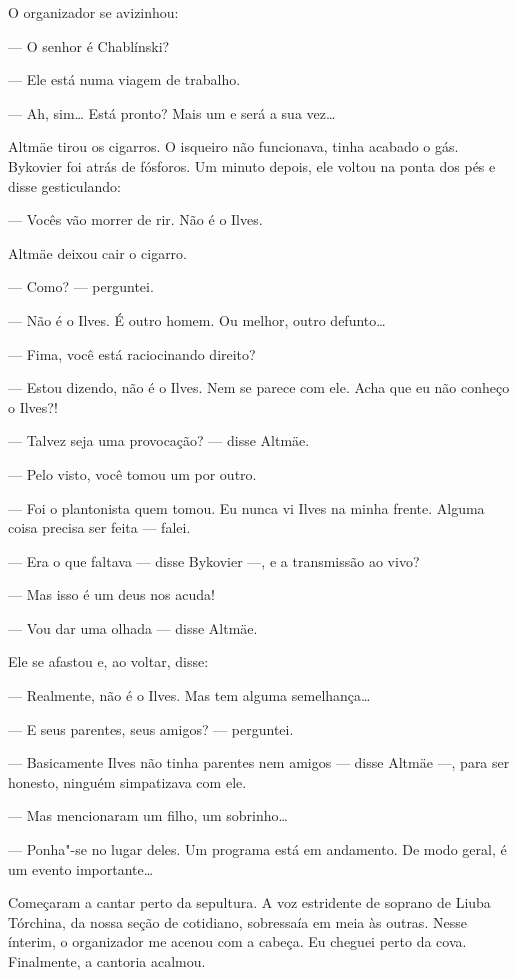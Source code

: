 O organizador se avizinhou:

--- O senhor é Chablínski?

--- Ele está numa viagem de trabalho.

--- Ah, sim\ldots{} Está pronto? Mais um e será a sua vez\ldots{}

Altmäe tirou os cigarros. O isqueiro não funcionava, tinha acabado o
gás. Bykovier foi atrás de fósforos. Um minuto depois, ele voltou na
ponta dos pés e disse gesticulando:

--- Vocês vão morrer de rir. Não é o Ilves.

Altmäe deixou cair o cigarro.

--- Como? --- perguntei.

--- Não é o Ilves. É outro homem. Ou melhor, outro defunto\ldots{}

--- Fima, você está raciocinando direito?

--- Estou dizendo, não é o Ilves. Nem se parece com ele. Acha que eu não
conheço o Ilves?!

--- Talvez seja uma provocação? --- disse Altmäe.

--- Pelo visto, você tomou um por outro.

--- Foi o plantonista quem tomou. Eu nunca vi Ilves na minha frente.
Alguma coisa precisa ser feita --- falei.

--- Era o que faltava --- disse Bykovier ---, e a transmissão ao vivo?

--- Mas isso é um deus nos acuda!

--- Vou dar uma olhada --- disse Altmäe.

Ele se afastou e, ao voltar, disse:

--- Realmente, não é o Ilves. Mas tem alguma semelhança\ldots{}

--- E seus parentes, seus amigos? --- perguntei.

--- Basicamente Ilves não tinha parentes nem amigos --- disse Altmäe
---, para ser honesto, ninguém simpatizava com ele.

--- Mas mencionaram um filho, um sobrinho\ldots{}

--- Ponha"-se no lugar deles. Um programa está em andamento. De modo
geral, é um evento importante\ldots{}

\bigskip

Começaram a cantar perto da sepultura. A voz estridente de soprano de
Liuba Tórchina, da nossa seção de cotidiano, sobressaía em meia às
outras. Nesse ínterim, o organizador me acenou com a cabeça. Eu cheguei
perto da cova. Finalmente, a cantoria acalmou.

